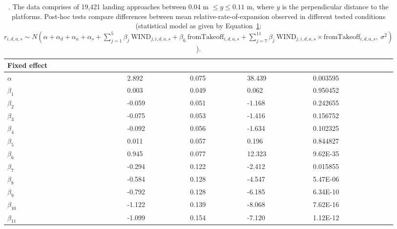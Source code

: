 \begin{table}[H]
\begin{tabular}{p{3.5cm}LLLL}
		\bottomrule         
		
	\end{tabular}
	
\end{table}


\begin{table}\centering
	\captionsetup{width=\textwidth, justification=justified}
	\caption{. The data comprises of 19,421 landing approaches between $0.04$ m $\leq y\leq 0.11$ m, where $y$ is the perpendicular distance to the platforms. Post-hoc tests compare differences between mean relative-rate-of-expansion observed in different tested conditions (statistical model as given by Equation~\ref{tb:sw_model_average_analysis}: 
		$r_{i,d,a,s} \sim N(\alpha + \alpha_d + \alpha_a + \alpha_s + \sum_{j=1}^{5} \beta_j~\textrm{WIND}_{j,i,d,a,s} + \beta_6~\textrm{fromTakeoff}_{i,d,a,s}  + 
		 \sum_{j=7}^{11} \beta_j~\textrm{WIND}_{j,i,d,a,s} \times \textrm{fromTakeoff}_{i,d,a,s},~\sigma^2)$).  }
	\label{tb:sw_model_average_analysis}
	\begin{tabular}{p{3cm}LLLL}
		\toprule
		Fixed effect             &  &  &  &  \\
		\midrule
		$\alpha$   & 2.892  & 0.075 & 38.439 & 0.003595 \\
		$\beta_1$  & 0.003  & 0.049 & 0.062  & 0.950452 \\
		$\beta_2$  & -0.059 & 0.051 & -1.168 & 0.242655 \\
		$\beta_3$  & -0.075 & 0.053 & -1.416 & 0.156752 \\
		$\beta_4$  & -0.092 & 0.056 & -1.634 & 0.102325 \\
		$\beta_5$  & 0.011  & 0.057 & 0.196  & 0.844827 \\
		$\beta_6$  & 0.945  & 0.077 & 12.323 & 9.62E-35 \\
		$\beta_7$  & -0.294 & 0.122 & -2.412 & 0.015855 \\
		$\beta_8$  & -0.584 & 0.128 & -4.547 & 5.47E-06 \\
		$\beta_9$  & -0.792 & 0.128 & -6.185 & 6.34E-10 \\
		$\beta_{10}$ & -1.122 & 0.139 & -8.068 & 7.62E-16 \\
		$\beta_{11}$ & -1.099 & 0.154 & -7.120 & 1.12E-12 \\
		

\end{tabular}
\end{table}
